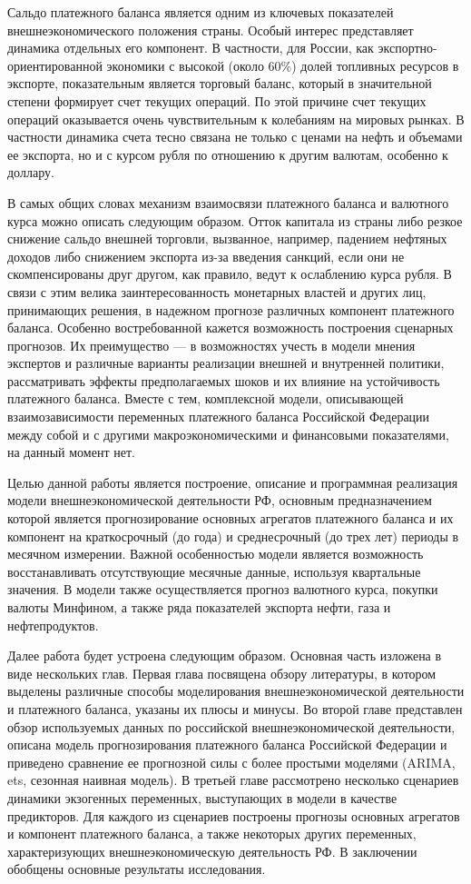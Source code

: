 \documentclass[a4paper, 14pt]{extarticle}
\begin{document}
Сальдо платежного баланса является одним из ключевых показателей внешнеэкономического положения страны. 
Особый интерес представляет динамика отдельных его компонент.
В частности, для России, как экспортно-ориентированной экономики с высокой (около $60 \%$) долей топливных ресурсов в экспорте, показательным является торговый баланс, который в значительной степени формирует счет текущих операций. 
По этой причине счет текущих операций оказывается очень чувствительным к колебаниям на мировых рынках.
В частности динамика счета тесно связана не только с ценами на нефть и объемами ее  экспорта, но и с курсом рубля по отношению к другим валютам, особенно к доллару.

В самых общих словах механизм взаимосвязи платежного баланса и валютного курса можно описать следующим образом. 
Отток капитала из страны либо резкое снижение сальдо внешней торговли, вызванное, например, падением нефтяных доходов либо снижением экспорта из-за введения санкций, если они не скомпенсированы друг другом, как правило, ведут к ослаблению курса рубля. 
В связи с этим велика заинтересованность монетарных властей и других лиц, принимающих решения, в надежном прогнозе различных компонент платежного баланса.
Особенно востребованной кажется возможность построения сценарных прогнозов.
Их преимущество — в возможностях учесть в модели мнения экспертов и различные варианты реализации внешней и внутренней политики, рассматривать эффекты предполагаемых шоков и их влияние на устойчивость платежного баланса.
Вместе с тем, комплексной модели, описывающей взаимозависимости переменных платежного баланса Российской Федерации между собой и с другими макроэкономическими и финансовыми показателями, на данный момент нет.

Целью данной работы является построение, описание и программная реализация модели внешнеэкономической деятельности РФ, основным предназначением которой является прогнозирование основных агрегатов платежного баланса и их компонент на краткосрочный (до года) и среднесрочный (до трех лет) периоды в месячном измерении. 
Важной особенностью модели является возможность восстанавливать отсутствующие месячные данные, используя квартальные значения. 
В модели также осуществляется прогноз валютного курса, покупки валюты Минфином, а также ряда показателей экспорта нефти, газа и нефтепродуктов.

Далее работа будет устроена следующим образом. 
Основная часть изложена в виде нескольких глав.
Первая глава посвящена обзору литературы, в котором выделены различные способы моделирования внешнеэкономической деятельности и платежного баланса, указаны их плюсы и минусы. 
Во второй главе представлен обзор используемых данных по российской внешнеэкономической деятельности, описана модель прогнозирования платежного баланса Российской Федерации и приведено сравнение ее прогнозной силы с более простыми моделями (ARIMA, ets, сезонная наивная модель).
В третьей главе рассмотрено несколько сценариев динамики экзогенных переменных, выступающих в модели в качестве предикторов. 
Для каждого из сценариев построены прогнозы основных агрегатов и компонент платежного баланса, а также некоторых других переменных, характеризующих внешнеэкономическую деятельность РФ.
В заключении обобщены основные результаты исследования. 
\newpage
\end{document}
